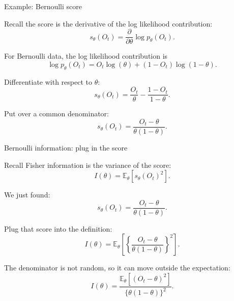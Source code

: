 \documentclass[xcolor={table}, handout]{beamer}
\begin{document}
\note{
\scriptsize \singlespacing

}
\begin{frame}{Example: Bernoulli score}

\begin{wideitemize}
\item Recall the score is the derivative of the log likelihood contribution:
\[
s_\theta(O_t)
  =
  \frac{\partial}{\partial\theta}\log p_\theta(O_t).
\]\pause
\item For Bernoulli data, the log likelihood contribution is
\[
\log p_\theta(O_t)
  =
  O_t \log(\theta)
  +(1-O_t)\log(1-\theta).
\]\pause
\item Differentiate with respect to $\theta$:
\[
s_\theta(O_t)
  =
  \frac{O_t}{\theta}
  -
  \frac{1-O_t}{1-\theta}.
\]\pause
\item Put over a common denominator:
\[
s_\theta(O_t)
  =
  \frac{O_t-\theta}{\theta(1-\theta)}.
\]
\end{wideitemize}

\end{frame}

\note{
\scriptsize \singlespacing

}
\begin{frame}{Bernoulli information: plug in the score}

\small

\begin{wideitemize}
\item Recall Fisher information is the variance of the score:
\[
I(\theta)
  =
  \mathbb{E}_\theta[s_\theta(O_t)^2].
\]\pause
\item We just found:
\[
s_\theta(O_t)
  =
  \frac{O_t-\theta}{\theta(1-\theta)}.
\]\pause
\item Plug that score into the definition:
\[
I(\theta)
  =
  \mathbb{E}_\theta
  \left[
    \left\{
      \frac{O_t-\theta}{\theta(1-\theta)}
    \right\}^2
  \right].
\]\pause
\item The denominator is not random, so it can move outside the expectation:
\[
I(\theta)
  =
  \frac{\mathbb{E}_\theta[(O_t-\theta)^2]}
       {\{\theta(1-\theta)\}^2}.
\]
\end{wideitemize}

\end{frame}
\end{document}
